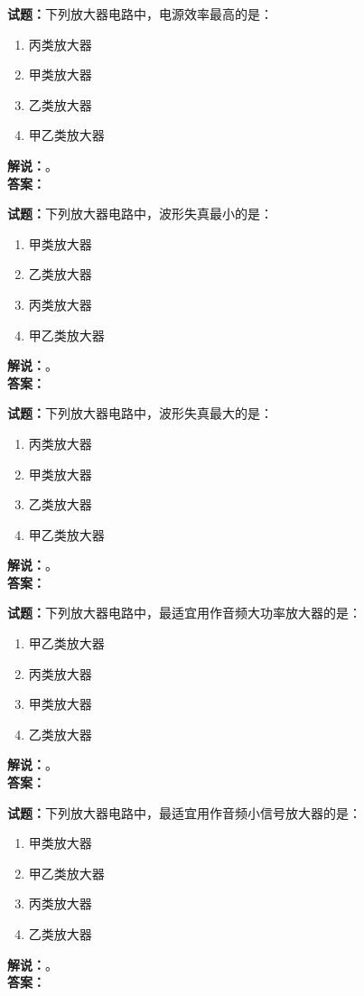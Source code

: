 \documentclass{ctexbook}
\begin{document}
\bigskip

\noindent\textbf{试题：}下列放大器电路中，电源效率最高的是：
\begin{enumerate}[leftmargin=3em]
  \item 丙类放大器
  \item 甲类放大器
  \item 乙类放大器
  \item 甲乙类放大器
\end{enumerate}
\noindent\textbf{解说：}\textbf{}。\\\noindent\textbf{答案：}

\bigskip

\noindent\textbf{试题：}下列放大器电路中，波形失真最小的是：
\begin{enumerate}[leftmargin=3em]
  \item 甲类放大器
  \item 乙类放大器
  \item 丙类放大器
  \item 甲乙类放大器
\end{enumerate}
\noindent\textbf{解说：}\textbf{}。\\\noindent\textbf{答案：}

\bigskip

\noindent\textbf{试题：}下列放大器电路中，波形失真最大的是：
\begin{enumerate}[leftmargin=3em]
  \item 丙类放大器
  \item 甲类放大器
  \item 乙类放大器
  \item 甲乙类放大器
\end{enumerate}
\noindent\textbf{解说：}\textbf{}。\\\noindent\textbf{答案：}

\bigskip

\noindent\textbf{试题：}下列放大器电路中，最适宜用作音频大功率放大器的是：
\begin{enumerate}[leftmargin=3em]
  \item 甲乙类放大器
  \item 丙类放大器
  \item 甲类放大器
  \item 乙类放大器
\end{enumerate}
\noindent\textbf{解说：}\textbf{}。\\\noindent\textbf{答案：}

\bigskip

\noindent\textbf{试题：}下列放大器电路中，最适宜用作音频小信号放大器的是：
\begin{enumerate}[leftmargin=3em]
  \item 甲类放大器
  \item 甲乙类放大器
  \item 丙类放大器
  \item 乙类放大器
\end{enumerate}
\noindent\textbf{解说：}\textbf{}。\\\noindent\textbf{答案：}
\end{document}
